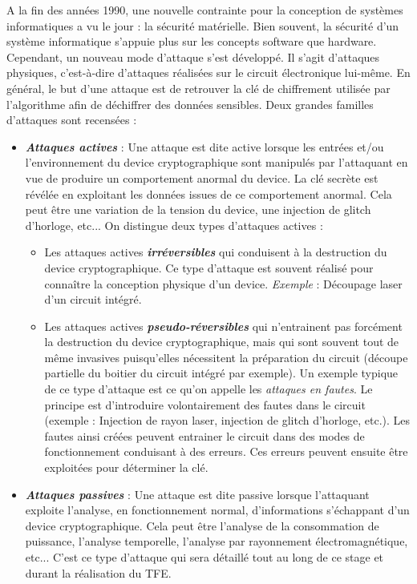 \documentclass[oneside]{book}
\begin{document}
\vspace{-0.1 cm}A la fin des années 1990, une nouvelle contrainte pour la conception de systèmes informatiques a vu le jour : la sécurité matérielle. Bien souvent, la sécurité d'un système informatique s'appuie plus sur les concepts software que hardware. Cependant, un nouveau mode d'attaque s'est développé. Il s'agit d'attaques physiques, c'est-à-dire d'attaques réalisées sur le circuit électronique lui-même. En général, le but d'une attaque est de retrouver la clé de chiffrement utilisée par l'algorithme afin de déchiffrer des données sensibles. Deux grandes familles d'attaques sont recensées : 
\begin{itemize}
\item \textbf{\textit{Attaques actives}} : Une attaque est dite active lorsque les entrées et/ou l'environnement du device cryptographique sont manipulés par l'attaquant en vue de produire un comportement anormal du device. La clé secrète est révélée en exploitant les données issues de ce comportement anormal. Cela peut être une variation de la tension du device, une injection de glitch d'horloge, etc... On distingue deux types d'attaques actives : 
\begin{itemize}
\item Les attaques actives \textbf{\textit{irréversibles}} qui conduisent à la destruction du device cryptographique. Ce type d'attaque est souvent réalisé pour connaître la conception physique d'un device. \textit{Exemple} : Découpage laser d’un circuit intégré.
\item Les attaques actives \textbf{\textit{pseudo-réversibles}} qui n’entrainent pas forcément la destruction du device cryptographique, mais qui sont souvent tout de même invasives puisqu’elles nécessitent la préparation du circuit (découpe partielle du boitier du circuit intégré par exemple). Un exemple typique de ce type d'attaque est ce qu'on appelle les \textit{attaques en fautes}. Le principe est d'introduire volontairement des fautes dans le circuit (exemple : Injection de rayon laser, injection de glitch d’horloge, etc.). Les fautes ainsi créées peuvent entrainer le circuit dans des modes de fonctionnement conduisant à des erreurs. Ces erreurs peuvent ensuite être exploitées pour déterminer la clé.
\end{itemize}
\item \textbf{\textit{Attaques passives}} : Une attaque est dite passive lorsque l'attaquant exploite l'analyse, en fonctionnement normal, d'informations s'échappant d'un device cryptographique. Cela peut être l'analyse de la consommation de puissance, l'analyse temporelle, l'analyse par rayonnement électromagnétique, etc... C'est ce type d'attaque qui sera détaillé tout au long de ce stage et durant la réalisation du TFE. \\
\end{itemize}
\end{document}
